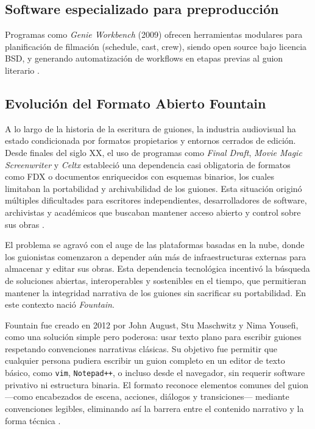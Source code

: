 \documentclass[12pt]{article}
\begin{document}
	\subsection{Software especializado para preproducción}
	Programas como \textit{Genie Workbench} (2009) ofrecen herramientas modulares para planificación de filmación (schedule, cast, crew), siendo open source bajo licencia BSD, y generando automatización de workflows en etapas previas al guion literario \parencite{turn0search26GenieWorkbench}.

	\subsection{Evolución del Formato Abierto Fountain}

	A lo largo de la historia de la escritura de guiones, la industria audiovisual ha estado condicionada por formatos propietarios y entornos cerrados de edición. Desde finales del siglo XX, el uso de programas como \textit{Final Draft}, \textit{Movie Magic Screenwriter} y \textit{Celtx} estableció una dependencia casi obligatoria de formatos como FDX o documentos enriquecidos con esquemas binarios, los cuales limitaban la portabilidad y archivabilidad de los guiones. Esta situación originó múltiples dificultades para escritores independientes, desarrolladores de software, archivistas y académicos que buscaban mantener acceso abierto y control sobre sus obras \parencite{fountain_wikipedia}.

	El problema se agravó con el auge de las plataformas basadas en la nube, donde los guionistas comenzaron a depender aún más de infraestructuras externas para almacenar y editar sus obras. Esta dependencia tecnológica incentivó la búsqueda de soluciones abiertas, interoperables y sostenibles en el tiempo, que permitieran mantener la integridad narrativa de los guiones sin sacrificar su portabilidad. En este contexto nació \textit{Fountain}.

	Fountain fue creado en 2012 por John August, Stu Maschwitz y Nima Yousefi, como una solución simple pero poderosa: usar texto plano para escribir guiones respetando convenciones narrativas clásicas. Su objetivo fue permitir que cualquier persona pudiera escribir un guion completo en un editor de texto básico, como \texttt{vim}, \texttt{Notepad++}, o incluso desde el navegador, sin requerir software privativo ni estructura binaria. El formato reconoce elementos comunes del guion —como encabezados de escena, acciones, diálogos y transiciones— mediante convenciones legibles, eliminando así la barrera entre el contenido narrativo y la forma técnica \parencite{fountain_official}.
\end{document}
